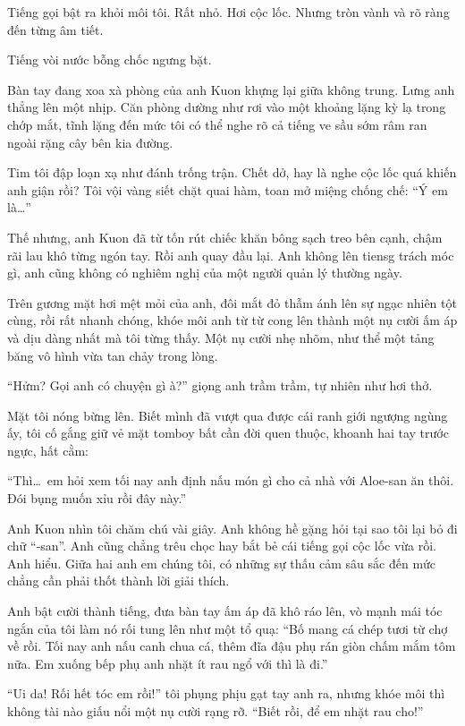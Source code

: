 \documentclass[../main.tex]{subfiles}
\begin{document}
Tiếng gọi bật ra khỏi môi tôi. Rất nhỏ. Hơi cộc lốc. Nhưng tròn vành và rõ ràng đến từng âm tiết.

Tiếng vòi nước bỗng chốc ngưng bặt.

Bàn tay đang xoa xà phòng của anh Kuon khựng lại giữa không trung. Lưng anh thẳng lên một nhịp. Căn phòng dường như rơi vào một khoảng lặng kỳ lạ trong chớp mắt, tĩnh lặng đến mức tôi có thể nghe rõ cả tiếng ve sầu sớm râm ran ngoài rặng cây bên kia đường.

Tim tôi đập loạn xạ như đánh trống trận. Chết dở, hay là nghe cộc lốc quá khiến anh giận rồi? Tôi vội vàng siết chặt quai hàm, toan mở miệng chống chế: ``Ý em là\dots''

Thế nhưng, anh Kuon đã từ tốn rút chiếc khăn bông sạch treo bên cạnh, chậm rãi lau khô từng ngón tay. Rồi anh quay đầu lại. Anh không lên tiensg trách móc gì, anh cũng không có nghiêm nghị của một người quản lý thường ngày.

Trên gương mặt hơi mệt mỏi của anh, đôi mắt đỏ thẫm ánh lên sự ngạc nhiên tột cùng, rồi rất nhanh chóng, khóe môi anh từ từ cong lên thành một nụ cười ấm áp và dịu dàng nhất mà tôi từng thấy. Một nụ cười nhẹ nhõm, như thể một tảng băng vô hình vừa tan chảy trong lòng.

``Hửm? Gọi anh có chuyện gì à?'' giọng anh trầm trầm, tự nhiên như hơi thở.

Mặt tôi nóng bừng lên. Biết mình đã vượt qua được cái ranh giới ngượng ngùng ấy, tôi cố gắng giữ vẻ mặt tomboy bất cần đời quen thuộc, khoanh hai tay trước ngực, hất cằm:

``Thì\dots\ em hỏi xem tối nay anh định nấu món gì cho cả nhà với Aloe-san ăn thôi. Đói bụng muốn xỉu rồi đây này.''

Anh Kuon nhìn tôi chăm chú vài giây. Anh không hề gặng hỏi tại sao tôi lại bỏ đi chữ ``-san''. Anh cũng chẳng trêu chọc hay bắt bẻ cái tiếng gọi cộc lốc vừa rồi. Anh hiểu. Giữa hai anh em chúng tôi, có những sự thấu cảm sâu sắc đến mức chẳng cần phải thốt thành lời giải thích.

Anh bật cười thành tiếng, đưa bàn tay ấm áp đã khô ráo lên, vò mạnh mái tóc ngắn của tôi làm nó rối tung lên như một tổ quạ: ``Bố mang cá chép tươi từ chợ về rồi. Tối nay anh nấu canh chua cá, thêm đĩa đậu phụ rán giòn chấm mắm tôm nữa. Em xuống bếp phụ anh nhặt ít rau ngổ với thì là đi.''

``Ui da! Rối hết tóc em rồi!'' tôi phụng phịu gạt tay anh ra, nhưng khóe môi thì không tài nào giấu nổi một nụ cười rạng rỡ. ``Biết rồi, để em nhặt rau cho!''
\end{document}
